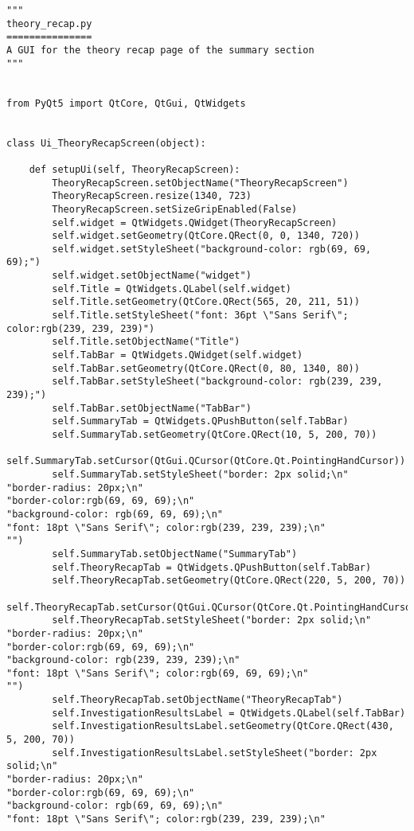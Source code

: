 \documentclass{article}
\begin{document}
\begin{lstlisting}
"""
theory_recap.py
===============
A GUI for the theory recap page of the summary section
"""


from PyQt5 import QtCore, QtGui, QtWidgets


class Ui_TheoryRecapScreen(object):

    def setupUi(self, TheoryRecapScreen):
        TheoryRecapScreen.setObjectName("TheoryRecapScreen")
        TheoryRecapScreen.resize(1340, 723)
        TheoryRecapScreen.setSizeGripEnabled(False)
        self.widget = QtWidgets.QWidget(TheoryRecapScreen)
        self.widget.setGeometry(QtCore.QRect(0, 0, 1340, 720))
        self.widget.setStyleSheet("background-color: rgb(69, 69, 69);")
        self.widget.setObjectName("widget")
        self.Title = QtWidgets.QLabel(self.widget)
        self.Title.setGeometry(QtCore.QRect(565, 20, 211, 51))
        self.Title.setStyleSheet("font: 36pt \"Sans Serif\"; color:rgb(239, 239, 239)")
        self.Title.setObjectName("Title")
        self.TabBar = QtWidgets.QWidget(self.widget)
        self.TabBar.setGeometry(QtCore.QRect(0, 80, 1340, 80))
        self.TabBar.setStyleSheet("background-color: rgb(239, 239, 239);")
        self.TabBar.setObjectName("TabBar")
        self.SummaryTab = QtWidgets.QPushButton(self.TabBar)
        self.SummaryTab.setGeometry(QtCore.QRect(10, 5, 200, 70))
        self.SummaryTab.setCursor(QtGui.QCursor(QtCore.Qt.PointingHandCursor))
        self.SummaryTab.setStyleSheet("border: 2px solid;\n"
"border-radius: 20px;\n"
"border-color:rgb(69, 69, 69);\n"
"background-color: rgb(69, 69, 69);\n"
"font: 18pt \"Sans Serif\"; color:rgb(239, 239, 239);\n"
"")
        self.SummaryTab.setObjectName("SummaryTab")
        self.TheoryRecapTab = QtWidgets.QPushButton(self.TabBar)
        self.TheoryRecapTab.setGeometry(QtCore.QRect(220, 5, 200, 70))
        self.TheoryRecapTab.setCursor(QtGui.QCursor(QtCore.Qt.PointingHandCursor))
        self.TheoryRecapTab.setStyleSheet("border: 2px solid;\n"
"border-radius: 20px;\n"
"border-color:rgb(69, 69, 69);\n"
"background-color: rgb(239, 239, 239);\n"
"font: 18pt \"Sans Serif\"; color:rgb(69, 69, 69);\n"
"")
        self.TheoryRecapTab.setObjectName("TheoryRecapTab")
        self.InvestigationResultsLabel = QtWidgets.QLabel(self.TabBar)
        self.InvestigationResultsLabel.setGeometry(QtCore.QRect(430, 5, 200, 70))
        self.InvestigationResultsLabel.setStyleSheet("border: 2px solid;\n"
"border-radius: 20px;\n"
"border-color:rgb(69, 69, 69);\n"
"background-color: rgb(69, 69, 69);\n"
"font: 18pt \"Sans Serif\"; color:rgb(239, 239, 239);\n"

\end{lstlisting}
\end{document}

